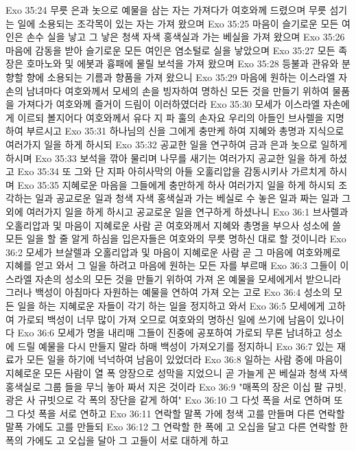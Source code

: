 Exo 35:24  무릇 은과 놋으로 예물을 삼는 자는 가져다가 여호와께 드렸으며 무릇 섬기는 일에 소용되는 조각목이 있는 자는 가져 왔으며
Exo 35:25  마음이 슬기로운 모든 여인은 손수 실을 낳고 그 낳은 청색 자색 홍색실과 가는 베실을 가져 왔으며
Exo 35:26  마음에 감동을 받아 슬기로운 모든 여인은 염소털로 실을 낳았으며
Exo 35:27  모든 족장은 호마노와 및 에봇과 흉패에 물릴 보석을 가져 왔으며
Exo 35:28  등불과 관유와 분향할 향에 소용되는 기름과 향품을 가져 왔으니
Exo 35:29  마음에 원하는 이스라엘 자손의 남녀마다 여호와께서 모세의 손을 빙자하여 명하신 모든 것을 만들기 위하여 물품을 가져다가 여호와께 즐거이 드림이 이러하였더라
Exo 35:30  모세가 이스라엘 자손에게 이르되 볼지어다 여호와께서 유다 지 파 훌의 손자요 우리의 아들인 브사렐을 지명하여 부르시고
Exo 35:31  하나님의 신을 그에게 충만케 하여 지혜와 총명과 지식으로 여러가지 일을 하게 하시되
Exo 35:32  공교한 일을 연구하여 금과 은과 놋으로 일하게 하시며
Exo 35:33  보석을 깎아 물리며 나무를 새기는 여러가지 공교한 일을 하게 하셨고
Exo 35:34  또 그와 단 지파 아히사막의 아들 오훌리압을 감동시키사 가르치게 하시며
Exo 35:35  지혜로운 마음을 그들에게 충만하게 하사 여러가지 일을 하게 하시되 조각하는 일과 공교로운 일과 청색 자색 홍색실과 가는 베실로 수 놓은 일과 짜는 일과 그 외에 여러가지 일을 하게 하시고 공교로운 일을 연구하게 하셨나니
Exo 36:1  브사렐과 오홀리압과 및 마음이 지혜로운 사람 곧 여호와께서 지혜와 총명을 부으사 성소에 쓸 모든 일을 할 줄 알게 하심을 입은자들은 여호와의 무릇 명하신 대로 할 것이니라
Exo 36:2  모세가 브살렐과 오홀리압과 및 마음이 지혜로운 사람 곧 그 마음에 여호와께로 지혜를 얻고 와서 그 일을 하려고 마음에 원하는 모든 자를 부르매
Exo 36:3  그들이 이스라엘 자손의 성소의 모든 것을 만들기 위하여 가져 온 예물을 모세에게서 받으니라 그러나 백성이 아침마다 자원하는 예물을 연하여 가져 오는 고로
Exo 36:4  성소의 모든 일을 하는 지혜로운 자들이 각기 하는 일을 정지하고 와서
Exo 36:5  모세에게 고하여 가로되 백성이 너무 많이 가져 오므로 여호와의 명하신 일에 쓰기에 남음이 있나이다
Exo 36:6  모세가 명을 내리매 그들이 진중에 공포하여 가로되 무론 남녀하고 성소에 드릴 예물을 다시 만들지 말라 하매 백성이 가져오기를 정지하니
Exo 36:7  있는 재료가 모든 일을 하기에 넉넉하여 남음이 있었더라
Exo 36:8  일하는 사람 중에 마음이 지혜로운 모든 사람이 열 폭 앙장으로 성막을 지었으니 곧 가늘게 꼰 베실과 청색 자색 홍색실로 그룹 들을 무늬 놓아 짜서 지은 것이라
Exo 36:9  "매폭의 장은 이십 팔 규빗, 광은 사 규빗으로 각 폭의 장단을 같게 하여"
Exo 36:10  그 다섯 폭을 서로 연하며 또 그 다섯 폭을 서로 연하고
Exo 36:11  연락할 말폭 가에 청색 고를 만들며 다른 연락할 말폭 가에도 고를 만들되
Exo 36:12  그 연락할 한 폭에 고 오십을 달고 다른 연락할 한 폭의 가에도 고 오십을 달아 그 고들이 서로 대하게 하고
